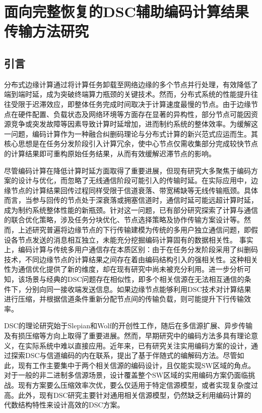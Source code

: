 \chapter{面向完整恢复的DSC辅助编码计算结果传输方法研究} \label{chapter-full-recovery}

\section{引言}
分布式边缘计算通过将计算任务卸载至网络边缘的多个节点并行处理，有效降低了端到端时延，成为突破终端算力瓶颈的关键技术。然而，分布式系统的性能提升往往受限于迟滞效应，即整体任务完成时间取决于计算速度最慢的节点。由于边缘节点在硬件配置、负载状态及网络环境等方面存在显著的异构性，部分节点可能因资源竞争或突发故障等因素导致计算时延增加，进而制约系统的整体效率。为缓解这一问题，编码计算作为一种融合纠删码理论与分布式计算的新兴范式应运而生。其核心思想是在任务分发阶段引入计算冗余，使中心节点仅需收集部分完成较快节点的计算结果即可重构原始任务结果，从而有效缓解迟滞节点的影响。

尽管编码计算在降低计算时延方面取得了重要进展，但现有研究大多聚焦于编码方案的设计与优化，而忽略了无线通信阶段可能引入的传输时延。在实际应用中，边缘节点的计算结果回传过程同样受限于信道衰落、带宽稀缺等无线传输瓶颈。具体而言，当参与回传的节点处于深衰落或拥塞信道时，通信时延可能远超计算时延，成为制约系统整体性能的新瓶颈。针对这一问题，已有部分研究探索了计算与通信的联合优化策略，涉及任务分块优化、节点选择策略及协作传输方案设计等。然而，上述研究普遍将边缘节点的下行传输建模为传统的多用户独立通信问题，即假设各节点发送的消息相互独立，未能充分挖掘编码计算固有的数据相关性。
事实上，编码计算与传统多用户通信存在本质区别：由于在任务分发阶段采用了纠删码技术，不同边缘节点的计算结果之间存在着由编码结构引入的强相关性。这种相关性为通信优化提供了新的维度，却在现有研究中尚未被充分利用。进一步分析可知，该场景与经典的DSC问题存在相似性，即多个相关信源在无法相互通信的条件下，分别向同一接收端发送信息。如果边缘节点能够利用DSC技术对计算结果进行压缩，并根据信道条件重新分配节点间的传输负载，则可能提升下行传输效率。

DSC的理论研究始于Slepian和Wolf的开创性工作，随后在多信源扩展、异步传输及有损压缩等方向上取得了重要进展。然而，早期研究中的编码方法多具有理论意义，在实际系统中难以直接应用。近年来，已有研究关注实用编码方案的设计，通过探索DSC与信道编码的内在联系，提出了基于伴随式的编解码方法。尽管如此，现有工作主要集中于两个相关信源的编码设计，且仅能实现SW区域的角点。对于一般的非二进制多信源场景，设计覆盖整个SW区域的实用编码方案仍面临挑战。现有方案要么压缩效率次优，要么仅适用于特定信源模型，或者实现复杂度过高。此外，现有DSC研究主要针对通用相关信源模型，仍然缺乏利用编码计算的代数结构特性来设计高效的DSC方案。


